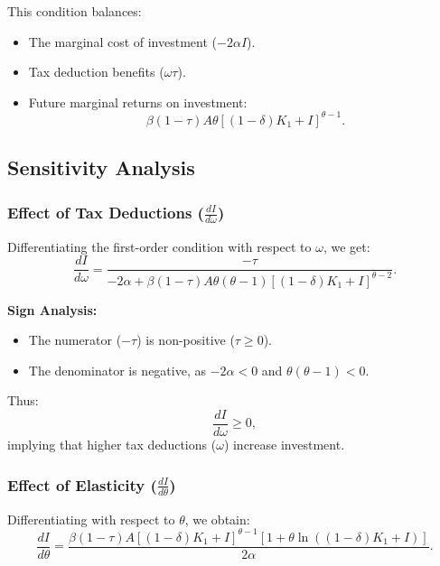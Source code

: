 \documentclass[11pt]{article}
\begin{document}
\noindent This condition balances:
\begin{itemize}
    \item The marginal cost of investment (\( -2\alpha I \)).
    \item Tax deduction benefits (\( \omega \tau \)).
    \item Future marginal returns on investment:
    $$
    \beta (1 - \tau) A \theta \left[(1 - \delta) K_1 + I\right]^{\theta - 1}.
    $$
\end{itemize}

\subsection{Sensitivity Analysis}

\subsubsection{Effect of Tax Deductions (\( \frac{dI}{d\omega} \))}

Differentiating the first-order condition with respect to \( \omega \), we get:
\begin{equation}
\frac{dI}{d\omega} = \frac{-\tau}{-2\alpha + \beta (1 - \tau) A \theta (\theta - 1) \left[(1 - \delta) K_1 + I\right]^{\theta - 2}}.
\end{equation}

\noindent \textbf{Sign Analysis:}
\begin{itemize}
    \item The numerator (\( -\tau \)) is non-positive (\( \tau \geq 0 \)).
    \item The denominator is negative, as \( -2\alpha < 0 \) and \( \theta (\theta - 1) < 0 \).
\end{itemize}
Thus:
$$
\frac{dI}{d\omega} \geq 0,
$$
implying that higher tax deductions (\( \omega \)) increase investment.

\subsubsection{Effect of Elasticity (\( \frac{dI}{d\theta} \))}

Differentiating with respect to \( \theta \), we obtain:
\begin{equation}
\frac{dI}{d\theta} = \frac{\beta (1 - \tau) A \left[(1 - \delta) K_1 + I\right]^{\theta - 1} \left[1 + \theta \ln \left((1 - \delta) K_1 + I\right)\right]}{2\alpha}.
\end{equation}
\end{document}
